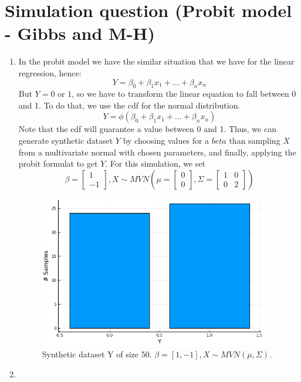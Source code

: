 \documentclass[12pt,letterpaper]{article}
\begin{document}
\section*{Simulation question (Probit model - Gibbs and M-H)}
\begin{enumerate}[leftmargin=!,labelindent=5pt]
\item 
In the probit model we have the similar situation that we have for the linear regression,
hence:
$$
Y = \beta_0 + \beta_1 x_1 + ... + \beta_n x_n
$$
But $Y = 0$ or $1$, so we have to transform the linear equation to fall between 0 and 1.
To do that, we use the cdf for the normal distribution.
$$
Y = \phi(\beta_0 + \beta_1 x_1 + ... + \beta_n x_n)
$$
Note that the cdf will guarantee a value between 0 and 1.
Thus, we can generate synthetic dataset $Y$ by choosing values
for a $beta$ than sampling $X$ from a multivariate normal with
chosen parameters, and finally,
applying the probit formulat to get $Y$. For this simulation,
we set 
$$
\beta =
\begin{bmatrix}
1 \\ -1
\end{bmatrix}
, X \sim MVN \left ( \mu = 
\begin{bmatrix}
0 \\ 0
\end{bmatrix}
, \Sigma = 
\begin{bmatrix}
1 & 0 \\ 0 & 2
\end{bmatrix}
\right)
$$

\begin{figure}[H]
    \centering
    \includegraphics[width=10cm]{images/Ex6_1.png}
    \caption{Synthetic dataset Y of size 50.
    $\beta = [1, -1], X \sim MVN(
    \mu, \Sigma)$.
    }
    \label{fig:1}
\end{figure}

\item 


\end{enumerate}
\end{document}
